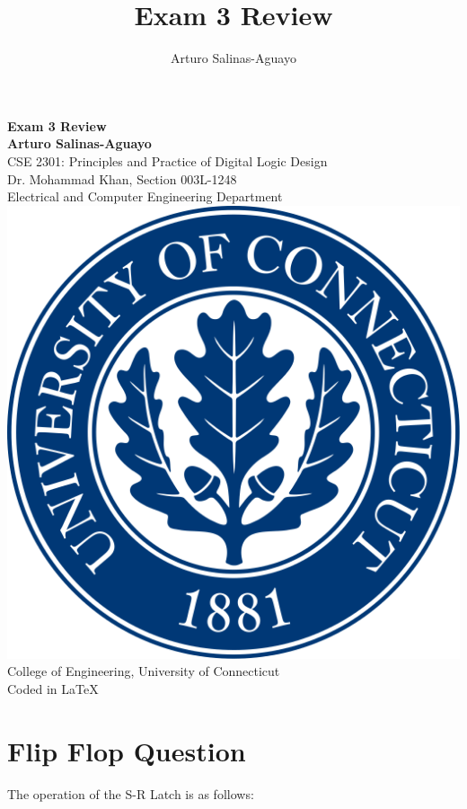 \documentclass[12pt]{article}
\author{Arturo Salinas-Aguayo}
\title{Exam 3 Review}
\begin{document}
\newcommand{\closure}[2][3]{%
	{}\mkern#1mu\overline{\mkern-#1mu#2}}
\newcommand\ncoverline[1]{\mkern1mu\overline{\mkern-1mu#1\mkern-1mu}\mkern1mu}
\begin{titlepage}
	\centering
	\vspace*{3cm}
	\huge\textbf{Exam 3 Review}\\
	\vspace{5cm}
	\Large\textbf{Arturo Salinas-Aguayo}\\
	\normalsize
	CSE 2301: Principles and Practice of Digital Logic Design\\
	Dr. Mohammad Khan, Section 003L-1248\\
	Electrical and Computer Engineering Department
	\vfill
	\includegraphics[scale=0.1]{uconnlogo}\\
	College of Engineering, University of Connecticut\\
	\scriptsize{Coded in \LaTeX}
	\vspace*{1cm}
\end{titlepage}
\section*{Flip Flop Question}
The operation of the S-R Latch is as follows:
\end{document}
